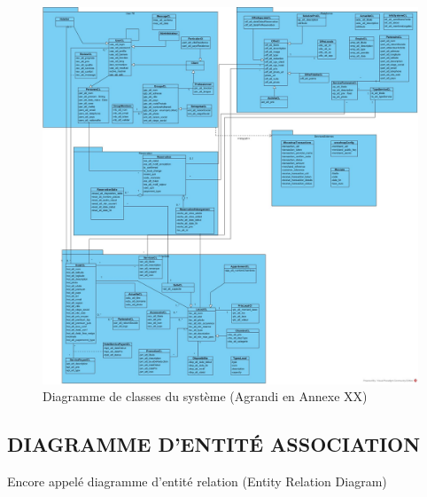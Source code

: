 \begin{figure}[!htbp]
	\begin{center}
		\includegraphics[scale=0.35]{images/diag_classe.jpg}
		\caption{Diagramme de classes du système (Agrandi en Annexe XX)}
		\label{classe_diagramme}
	\end{center}
\end{figure}
\cleardoublepage
\subsection{DIAGRAMME D'ENTITÉ ASSOCIATION}

Encore appelé diagramme d’entité relation (Entity Relation Diagram)

